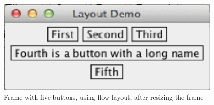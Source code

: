 



\begin {figure}

\includegraphics{figs/ch10/flow2.eps}

\caption {Frame with five buttons, using flow layout, after resizing
the frame}

\label {fig:flow2}

\end {figure}

